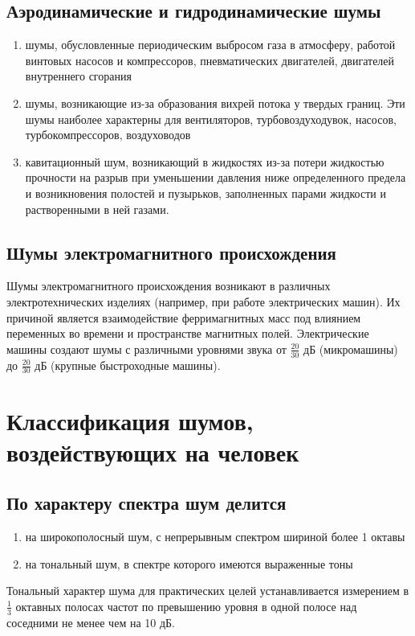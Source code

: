 \documentclass[a5paper, 12dd, twoside]{article}
\begin{document}
\subsection{Аэродинамические и гидродинамические шумы}
\begin{enumerate}
    \item шумы, обусловленные периодическим выбросом газа в ат\-мос\-фе\-ру, работой винтовых насосов и компрессоров, пневматических двигателей, двигателей внутреннего сгорания
    \item шумы, возникающие из-за образования вихрей потока у твердых границ. Эти шумы наиболее характерны для вентиляторов, турбовоздуходувок, насосов, турбокомпрессоров, воздуховодов
    \item кавитационный шум, возникающий в жидкостях из-за потери жидкостью прочности на разрыв при уменьшении давления ниже определенного предела и возникновения полостей и пузырьков, заполненных парами жидкости и растворенными в ней газами.
\end{enumerate}

\subsection{Шумы электромагнитного происхождения}
Шумы электромагнитного происхождения возникают в различных электротехнических изделиях (например, при работе электрических машин). Их причиной является взаимодействие ферримагнитных масс под влиянием переменных во времени и пространстве магнитных полей. Электрические машины создают шумы с различными уровнями звука от \(\frac{20}{30}\) дБ (микромашины) до \(\frac{20}{30}\) дБ (крупные быстроходные машины).

\section{Классификация шумов, воздействующих на человек}
\subsection{По характеру спектра шум делится}
\begin{enumerate}
    \item на широкополосный шум, с непрерывным спектром шириной более 1 октавы
    \item на тональный шум, в спектре которого имеются выраженные тоны
\end{enumerate}
Тональный характер шума для практических целей устанавливается измерением в \(\frac{1}{3}\) октавных полосах частот по превышению уровня в одной полосе над соседними не менее чем на 10 дБ.
\end{document}
